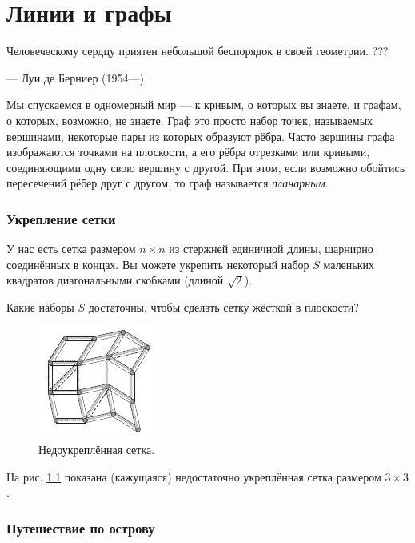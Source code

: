 \chapter{Линии и графы}

\setlength{\epigraphwidth}{.83\textwidth}
\epigraph{Человеческому сердцу приятен небольшой беспорядок в своей геометрии. ???}{--- Луи де Берниер (1954---)}


Мы спускаемся в одномерный мир --- к кривым, о которых вы знаете, и графам, о которых, возможно, не знаете.
Граф это просто набор точек, называемых вершинами, некоторые пары из которых образуют рёбра.
Часто вершины графа изображаются точками на плоскости, а его рёбра отрезками или кривыми, соединяющими одну свою вершину с другой.
При этом, если возможно обойтись пересечений рёбер друг с другом, то граф называется \emph{планарным}.

\subsection*{Укрепление сетки}

У нас есть сетка размером $n \times n$ из стержней единичной длины, шарнирно соединённых в концах.
Вы можете укрепить некоторый набор $S$ маленьких квадратов диагональными скобками (длиной $\sqrt{2}$).

Какие наборы $S$ достаточны, чтобы сделать сетку жёсткой в плоскости?

\begin{figure}[ht!]
\centering
\includegraphics[scale=1]{pics/lattice1}
\caption{Недоукреплённая сетка.}
\label{pic:lattice1}
\end{figure}

На рис. \ref{pic:lattice1} показана (кажущаяся) недостаточно укреплённая сетка размером $3 \times 3$.

\subsection*{Путешествие по острову}

